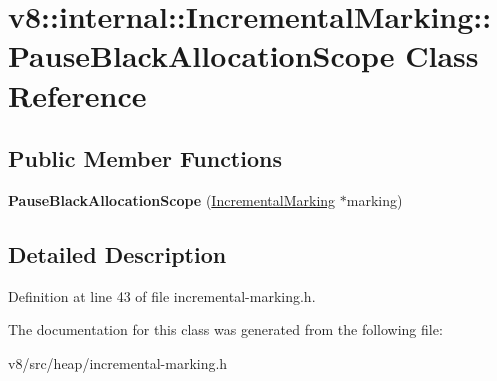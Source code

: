 \hypertarget{classv8_1_1internal_1_1IncrementalMarking_1_1PauseBlackAllocationScope}{}\section{v8\+:\+:internal\+:\+:Incremental\+Marking\+:\+:Pause\+Black\+Allocation\+Scope Class Reference}
\label{classv8_1_1internal_1_1IncrementalMarking_1_1PauseBlackAllocationScope}
\subsection*{Public Member Functions}
\begin{DoxyCompactItemize}
\item 
\mbox{\label{classv8_1_1internal_1_1IncrementalMarking_1_1PauseBlackAllocationScope_abb8baac856434389c8bf7bed2b76c926}} 
{\bfseries Pause\+Black\+Allocation\+Scope} (\mbox{\hyperlink{classv8_1_1internal_1_1IncrementalMarking}{Incremental\+Marking}} $\ast$marking)
\end{DoxyCompactItemize}


\subsection{Detailed Description}


Definition at line 43 of file incremental-\/marking.\+h.



The documentation for this class was generated from the following file\+:\begin{DoxyCompactItemize}
\item 
v8/src/heap/incremental-\/marking.\+h\end{DoxyCompactItemize}
